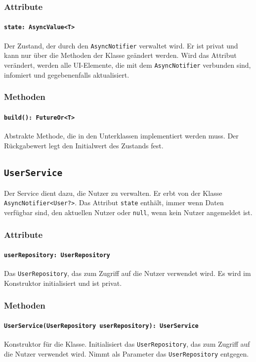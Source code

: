 \documentclass{entwurfsheft}
\begin{document}
\begin{sloppypar}
\subsubsection*{Attribute}
\paragraph{\texttt{state: AsyncValue<T>}}
Der Zustand, der durch den \texttt{AsyncNotifier} verwaltet wird. Er ist privat und kann nur über die Methoden der Klasse geändert werden. Wird das Attribut verändert, werden alle UI-Elemente, die mit dem \texttt{AsyncNotifier} verbunden sind, infomiert und gegebenenfalls aktualisiert.
\subsubsection*{Methoden}
\paragraph{\texttt{build(): FutureOr<T>}}
Abstrakte Methode, die in den Unterklassen implementiert werden muss. Der Rückgabewert legt den Initialwert des Zustands fest.
\newpage
\subsection{\texttt{UserService}}
\label{sec:userService}
Der Service dient dazu, die Nutzer zu verwalten. Er erbt von der Klasse \texttt{AsyncNotifier<User?>}. Das Attribut \texttt{state} enthält, immer wenn Daten verfügbar sind, den aktuellen Nutzer oder \texttt{null}, wenn kein Nutzer angemeldet ist.

\subsubsection*{Attribute}
\paragraph{\texttt{userRepository: UserRepository}}
Das \texttt{UserRepository}, das zum Zugriff auf die Nutzer verwendet wird. Es wird im Konstruktor initialisiert und ist privat.
\subsubsection*{Methoden}
\paragraph{\texttt{UserService(UserRepository userRepository): UserService}}
Konstruktor für die Klasse. Initialisiert das \texttt{UserRepository}, das zum Zugriff auf die Nutzer verwendet wird. Nimmt als Parameter das \texttt{UserRepository} entgegen.

\end{sloppypar}
\end{document}
